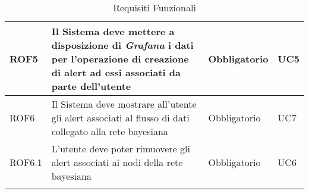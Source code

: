 \begin{center}
\begin{longtable}[c]{|m{}|m{}|m{}|m{}|}
\hline
\rowcolor{grigio}ROF5 & Il Sistema deve mettere a disposizione di \textit{Grafana} i dati per l'operazione di creazione di alert ad essi associati da parte dell'utente & Obbligatorio & UC5\\
\hline
ROF6 & Il Sistema deve mostrare all'utente gli alert associati al flusso di dati collegato alla rete bayesiana & Obbligatorio & UC7\\ 
\hline
\rowcolor{grigio}ROF6.1 & L'utente deve poter rimuovere gli alert associati ai nodi della rete bayesiana & Obbligatorio & UC6\\ 
\hline
\caption{Requisiti Funzionali}
\end{longtable}
\end{center}



